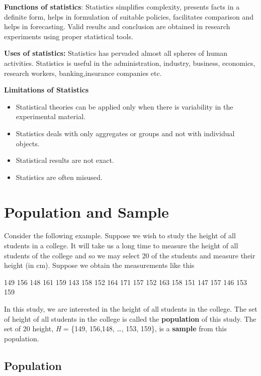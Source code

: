 \documentclass[
]{book}
\begin{document}
\textbf{Functions of statistics}: Statistics simplifies complexity, presents
facts in a definite form, helps in formulation of suitable policies,
facilitates comparison and helps in forecasting. Valid results and
conclusion are obtained in research experiments using proper statistical
tools.

\textbf{Uses of statistics:} Statistics has pervaded almost all spheres of
human activities. Statistics is useful in the administration, industry,
business, economics, research workers, banking,insurance companies etc.

\textbf{Limitations of Statistics}

\begin{itemize}
\item
  Statistical theories can be applied only when there is variability
  in the experimental material.
\item
  Statistics deals with only aggregates or groups and not with
  individual objects.
\item
  Statistical results are not exact.
\item
  Statistics are often misused.
\end{itemize}

\hypertarget{population-and-sample}{%
\section{Population and Sample}\label{population-and-sample}}

Consider the following example. Suppose we wish to study the height of
all students in a college. It will take us a long time to measure the
height of all students of the college and so we may select 20 of the
students and measure their height (in cm). Suppose we obtain the
measurements like this

149 156 148 161 159 143 158 152 164 171 157 152 163 158 151 147 157 146
153 159

In this study, we are interested in the height of all students in the
college. The set of height of all students in the college is called the
\textbf{population} of this study. The set of 20 height, \emph{H} = \{149, 156,148,
\ldots, 153, 159\}, is a \textbf{sample} from this population.

\hypertarget{population}{%
\subsection{Population}\label{population}}
\end{document}
